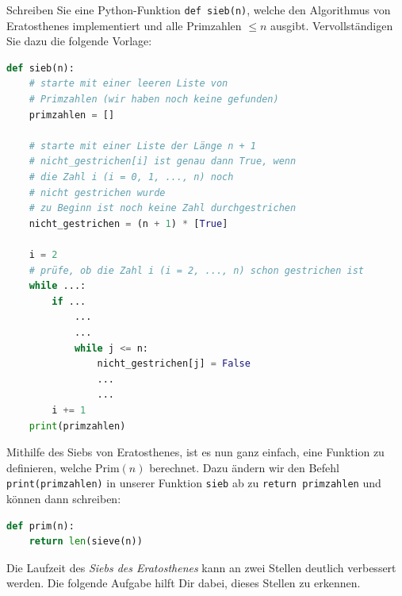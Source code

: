 \begin{myexercise}\label{myexercise:sieb}
	Schreiben Sie eine Python-Funktion \lstinline|def sieb(n)|, welche den Algorithmus von Eratosthenes implementiert und alle Primzahlen $\leq n$ ausgibt. Vervollständigen Sie dazu die folgende Vorlage:
	\begin{lstlisting}[language=Python,caption=Sieb des Eratosthenes,numbers=none]
def sieb(n):
    # starte mit einer leeren Liste von
    # Primzahlen (wir haben noch keine gefunden)
    primzahlen = []

    # starte mit einer Liste der Länge n + 1
    # nicht_gestrichen[i] ist genau dann True, wenn
    # die Zahl i (i = 0, 1, ..., n) noch
    # nicht gestrichen wurde
    # zu Beginn ist noch keine Zahl durchgestrichen
    nicht_gestrichen = (n + 1) * [True]

    i = 2
    # prüfe, ob die Zahl i (i = 2, ..., n) schon gestrichen ist
    while ...:
        if ...
            ...
            ...
            while j <= n:
                nicht_gestrichen[j] = False
                ...
                ...
        i += 1
    print(primzahlen)
\end{lstlisting}
	\begin{myanswer}
		
	\end{myanswer}
\end{myexercise}

Mithilfe des Siebs von Eratosthenes, ist es nun ganz einfach, eine Funktion zu definieren, welche $\text{Prim}(n)$ berechnet. Dazu ändern wir den Befehl \lstinline|print(primzahlen)| in unserer Funktion \lstinline|sieb| ab zu \lstinline|return primzahlen| und können dann schreiben:
\begin{lstlisting}[language=Python,caption=Prim,numbers=none]
def prim(n):
    return len(sieve(n))
\end{lstlisting}
Die Laufzeit des \textit{Siebs des Eratosthenes} kann an zwei Stellen deutlich verbessert werden. Die folgende Aufgabe hilft Dir dabei, dieses Stellen zu erkennen.

